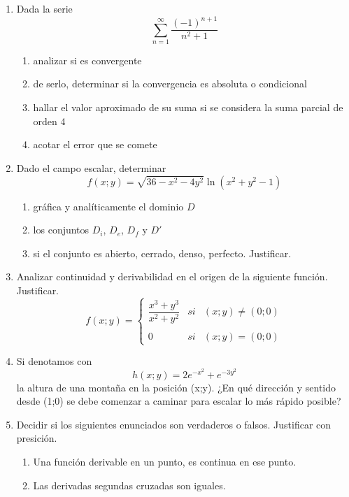\documentclass[9pt,a4paper]{extarticle}
\begin{document}
\begin{enumerate}
    \item Dada la serie 
    \[
    \sum_{n=1}^{\infty}\dfrac{(-1)^{n+1}}{n^{2}+1}
    \]
    \begin{enumerate}
    \item analizar si es convergente
    \item de serlo, determinar si la convergencia es absoluta o condicional
    \item hallar el valor aproximado de su suma si se considera la suma parcial de orden 4
    \item acotar el error que se comete
    \end{enumerate}
    
    
    \item Dado el campo escalar, determinar
    \[
    f(x;y)= \sqrt{36-x^{2}-4y^{2}} \ln{(x^2 + y^2 - 1)}
    \]

    \begin{enumerate}
        \item gráfica y analíticamente el dominio $D$
        \item los conjuntos $D_i$, $D_e$, $D_f$ y $D'$
        \item si el conjunto es abierto, cerrado, denso, perfecto. Justificar.
    \end{enumerate}
    
    
    \item Analizar continuidad y derivabilidad en el origen de la siguiente función. Justificar.    
    \[
    f(x;y)= \left\{ \begin{array}{lcc}
             \dfrac{x^3 + y^3}{x^2 + y^2} &   si  & (x;y) \neq (0;0) \\
             \\ 0 &  si & (x;y) = (0;0)
             \end{array}
   \right.
    \]
    
    \item Si denotamos con\[ h(x;y)=2e^{-x^2}+e^{-3y^2}\] la altura de una montaña en la posición (x;y). ¿En qué dirección y sentido desde (1;0) se debe comenzar a caminar para escalar lo más rápido posible?
    
    
    \item Decidir si los siguientes enunciados son verdaderos o falsos. Justificar con presición.
    \begin{enumerate}
        \item Una función derivable en un punto, es continua en ese punto.
        \item Las derivadas segundas cruzadas son iguales.
    \end{enumerate}
\end{enumerate}
\end{document}
